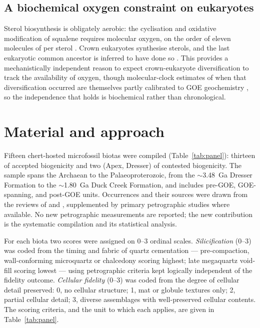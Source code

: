 \documentclass[11pt]{article}
\begin{document}
\subsection{A biochemical oxygen constraint on eukaryotes}

Sterol biosynthesis is obligately aerobic: the cyclisation and oxidative modification of squalene
requires molecular oxygen, on the order of eleven molecules of  per sterol
\citep{Gold2017,Desmond2009}. Crown eukaryotes synthesise sterols, and the last eukaryotic common
ancestor is inferred to have done so \citep{Desmond2009}. This provides a mechanistically independent
reason to expect crown-eukaryote diversification to track the availability of oxygen, though
molecular-clock estimates of when that diversification occurred are themselves partly calibrated to
GOE geochemistry \citep{Gold2017}, so the independence that holds is biochemical rather than
chronological.

\section{Material and approach}

Fifteen chert-hosted microfossil biotas were compiled (Table~\ref{tab:panel}): thirteen of accepted
biogenicity and two (Apex, Dresser) of contested biogenicity. The sample spans the Archaean to the
Palaeoproterozoic, from the $\sim$3.48~Ga Dresser Formation to the $\sim$1.80~Ga Duck Creek
Formation, and includes pre-GOE, GOE-spanning, and post-GOE units. Occurrences and their sources
were drawn from the reviews of \citet{Javaux2018} and \citet{Wacey2014}, supplemented by primary
petrographic studies where available. No new petrographic measurements are reported; the new
contribution is the systematic compilation and its statistical analysis.

For each biota two scores were assigned on 0--3 ordinal scales. \emph{Silicification} (0--3) was
coded from the timing and fabric of quartz cementation --- pre-compaction, wall-conforming
microquartz or chalcedony scoring highest; late megaquartz void-fill scoring lowest --- using
petrographic criteria kept logically independent of the fidelity outcome. \emph{Cellular fidelity}
(0--3) was coded from the degree of cellular detail preserved: 0, no cellular structure; 1, mat or
globule textures only; 2, partial cellular detail; 3, diverse assemblages with well-preserved
cellular contents. The scoring criteria, and the unit to which each applies, are given in
Table~\ref{tab:panel}.
\end{document}

